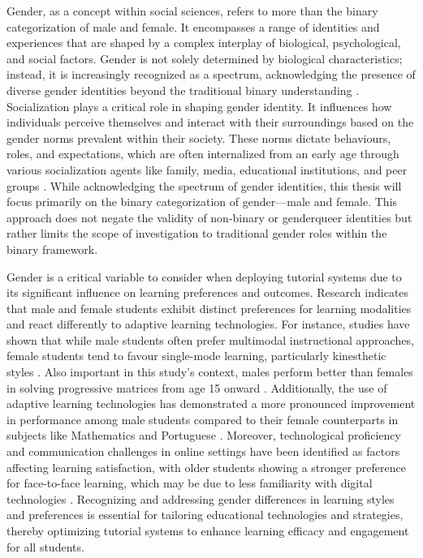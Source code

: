 Gender, as a concept within social sciences, refers to more than the binary categorization of male and female.
It encompasses a range of identities and experiences that are shaped by a complex interplay of biological, psychological, and social factors.
Gender is not solely determined by biological characteristics; instead, it is increasingly recognized as a spectrum, acknowledging the presence of diverse gender identities beyond the traditional binary understanding \parencite{lindqvistWhatGenderAnyway2021}.
Socialization plays a critical role in shaping gender identity. It influences how individuals perceive themselves and interact with their surroundings based on the gender norms prevalent within their society.
These norms dictate behaviours, roles, and expectations, which are often internalized from an early age through various socialization agents like family, media, educational institutions, and peer groups \parencite{kampshoffHandbuchGeschlechterforschungUnd2012}.
While acknowledging the spectrum of gender identities, this thesis will focus primarily on the binary categorization of gender—male and female.
This approach does not negate the validity of non-binary or genderqueer identities but rather limits the scope of investigation to traditional gender roles within the binary framework.

Gender is a critical variable to consider when deploying tutorial systems due to its significant influence on learning preferences and outcomes.
Research indicates that male and female students exhibit distinct preferences for learning modalities and react differently to adaptive learning technologies.
For instance, studies have shown that while male students often prefer multimodal instructional approaches, female students tend to favour single-mode learning, particularly kinesthetic styles \parencite{wehrweinGenderDifferencesLearning2007}.
Also important in this study's context, males perform better than females in solving progressive matrices from age 15 onward \parencite{lynnSexDifferencesProgressive2004}.
Additionally, the use of adaptive learning technologies has demonstrated a more pronounced improvement in performance among male students compared to their female counterparts in subjects like Mathematics and Portuguese \parencite{desantanaEvaluatingImpactMars2016}.
Moreover, technological proficiency and communication challenges in online settings have been identified as factors affecting learning satisfaction, with older students showing a stronger preference for face-to-face learning, which may be due to less familiarity with digital technologies \parencite{dabajRoleGenderAge2009}.
Recognizing and addressing gender differences in learning styles and preferences is essential for tailoring educational technologies and strategies, thereby optimizing tutorial systems to enhance learning efficacy and engagement for all students.

